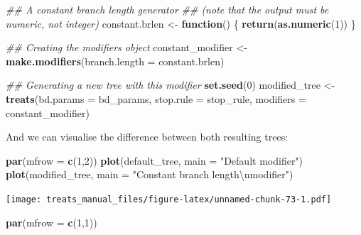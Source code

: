 \documentclass[
]{book}
\newenvironment{Shaded}{\begin{snugshade}}{\end{snugshade}}
\newcommand{\CharTok}[1]{\textcolor[rgb]{0.31,0.60,0.02}{#1}}
\newcommand{\CommentTok}[1]{\textcolor[rgb]{0.56,0.35,0.01}{\textit{#1}}}
\newcommand{\ControlFlowTok}[1]{\textcolor[rgb]{0.13,0.29,0.53}{\textbf{#1}}}
\newcommand{\DataTypeTok}[1]{\textcolor[rgb]{0.13,0.29,0.53}{#1}}
\newcommand{\DecValTok}[1]{\textcolor[rgb]{0.00,0.00,0.81}{#1}}
\newcommand{\KeywordTok}[1]{\textcolor[rgb]{0.13,0.29,0.53}{\textbf{#1}}}
\newcommand{\NormalTok}[1]{#1}
\newcommand{\StringTok}[1]{\textcolor[rgb]{0.31,0.60,0.02}{#1}}
\begin{document}
\begin{Shaded}
\begin{Highlighting}[]
\CommentTok{\#\# A constant branch length generator}
\CommentTok{\#\# (note that the output must be numeric, not integer)}
\NormalTok{constant.brlen \textless{}{-}}\StringTok{ }\ControlFlowTok{function}\NormalTok{() \{}
    \KeywordTok{return}\NormalTok{(}\KeywordTok{as.numeric}\NormalTok{(}\DecValTok{1}\NormalTok{))}
\NormalTok{\}}

\CommentTok{\#\# Creating the modifiers object}
\NormalTok{constant\_modifier \textless{}{-}}\StringTok{ }\KeywordTok{make.modifiers}\NormalTok{(}\DataTypeTok{branch.length =}\NormalTok{ constant.brlen)}

\CommentTok{\#\# Generating a new tree with this modifier}
\KeywordTok{set.seed}\NormalTok{(}\DecValTok{0}\NormalTok{)}
\NormalTok{modified\_tree \textless{}{-}}\StringTok{ }\KeywordTok{treats}\NormalTok{(}\DataTypeTok{bd.params =}\NormalTok{ bd\_params,}
                      \DataTypeTok{stop.rule =}\NormalTok{ stop\_rule,}
                      \DataTypeTok{modifiers =}\NormalTok{ constant\_modifier)}
\end{Highlighting}
\end{Shaded}

And we can visualise the difference between both resulting trees:

\begin{Shaded}
\begin{Highlighting}[]
\KeywordTok{par}\NormalTok{(}\DataTypeTok{mfrow =} \KeywordTok{c}\NormalTok{(}\DecValTok{1}\NormalTok{,}\DecValTok{2}\NormalTok{))}
\KeywordTok{plot}\NormalTok{(default\_tree,  }\DataTypeTok{main =} \StringTok{"Default modifier"}\NormalTok{)}
\KeywordTok{plot}\NormalTok{(modified\_tree, }\DataTypeTok{main =} \StringTok{"Constant branch length}\CharTok{\textbackslash{}n}\StringTok{modifier"}\NormalTok{)}
\end{Highlighting}
\end{Shaded}

\texttt{[image: treats\_manual\_files/figure-latex/unnamed-chunk-73-1.pdf]}

\begin{Shaded}
\begin{Highlighting}[]
\KeywordTok{par}\NormalTok{(}\DataTypeTok{mfrow =} \KeywordTok{c}\NormalTok{(}\DecValTok{1}\NormalTok{,}\DecValTok{1}\NormalTok{))}
\end{Highlighting}
\end{Shaded}
\end{document}
